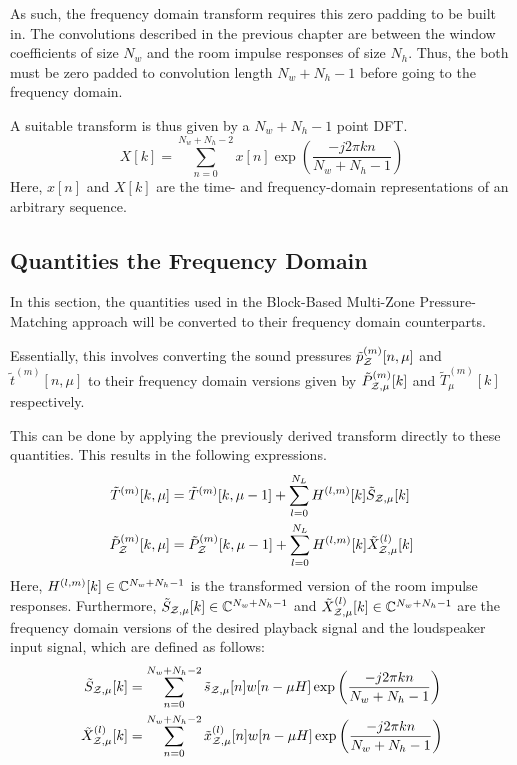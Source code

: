 As such, the frequency domain transform requires this zero padding to be built in.
The convolutions described in the previous chapter are between the window coefficients of size $N_w$ 
and the room impulse responses of size $N_h$.
Thus, the both must be zero padded to convolution length $N_w + N_h - 1$ before going to the frequency domain.

A suitable transform is thus given by a $N_w + N_h - 1$ point DFT.
\begin{equation}
    X[k] = \sum_{n=0}^{N_w + N_h - 2} x[n]\exp\left(\frac{-j2\pi k n}{N_w + N_h - 1}\right)
\end{equation}
Here, $x[n]$ and $X[k]$ are the time- and frequency-domain representations of an arbitrary sequence.  

\subsection{Quantities the Frequency Domain}
In this section, the quantities used in the Block-Based Multi-Zone Pressure-Matching approach will be converted to their frequency domain counterparts.

Essentially, this involves converting the sound pressures $\tilde{p}_{\mathcal{Z}}^{(m)}[n,\mu]$ and $\tilde{t}^{(m)}[n,\mu]$ 
to their frequency domain versions given by $\tilde{P}_{\mathcal{Z},\mu}^{(m)}[k]$ and $\tilde{T}_\mu^{(m)}[k]$ respectively.

This can be done by applying the previously derived transform directly to these quantities.
This results in the following expressions.
\begin{align}
    \tilde{T}^{(m)}[k, \mu] &= \tilde{T}^{(m)}[k, \mu - 1] + \sum_{l=0}^{N_L}H^{(l,m)}[k]\tilde{S}_{\mathcal{Z},\mu}[k] \\
    \tilde{P}_{\mathcal{Z}}^{(m)}[k, \mu] &= \tilde{P}_{\mathcal{Z}}^{(m)}[k, \mu - 1] 
        + \sum_{l=0}^{N_L}H^{(l,m)}[k]\tilde{X}^{(l)}_{\mathcal{Z},\mu}[k]  
\end{align}
Here, $H^{(l,m)}[k]\in\mathbb{C}^{N_w + N_h - 1}$ is the transformed version of the room impulse responses.
Furthermore, $\tilde{S}_{\mathcal{Z},\mu}[k]\in\mathbb{C}^{N_w + N_h - 1}$ and 
$\tilde{X}^{(l)}_{\mathcal{Z},\mu}[k]\in\mathbb{C}^{N_w + N_h - 1}$ are the frequency domain versions of
the desired playback signal and the loudspeaker input signal, which are defined as follows:
\begin{align}
    \tilde{S}_{\mathcal{Z},\mu}[k] &= \sum_{n=0}^{N_w + N_h - 2} \tilde{s}_{\mathcal{Z},\mu}[n]w[n - \mu H]
        \exp\left(\frac{-j2\pi k n}{N_w + N_h - 1}\right) \\
    \tilde{X}^{(l)}_{\mathcal{Z},\mu}[k] &= \sum_{n=0}^{N_w + N_h - 2} \tilde{x}^{(l)}_{\mathcal{Z},\mu}[n]w[n - \mu H]
        \exp\left(\frac{-j2\pi k n}{N_w + N_h - 1}\right)
\end{align}

